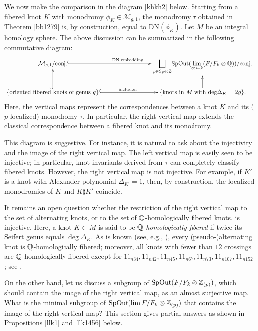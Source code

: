 \documentclass{article}
\theoremstyle{plain}
\theoremstyle{definition}
\newcommand{\Q}{{\Bbb Q}}
\newcommand{\Z}{{\Bbb Z}}
\begin{document}
{We now make the comparison in the diagram \eqref{khkh2} below.
Starting from a fibered knot $K$ with monodromy $\phi_K \in \mathcal{M}_{g,1}$, the monodromy $\tau$ obtained in Theorem \ref{bb1279} is, by construction, equal to $\mathrm{DN}(\phi_K)$.
Let $M$ be an integral homology sphere.
The above discussion can be summarized in the following commutative diagram:
\begin{equation}\label{khkh2}{
\xymatrix{ \mathcal{M}_{g,1} /\textrm{conj.} \ar@{^{(}->}[rrr]^{ \textrm{DN embedding} }
& & & \displaystyle{\bigsqcup_{ p \in \mathrm{Spec}\Z}} \mathrm{SpOut} (\lim_{\infty \leftarrow k } (F/ F_k \otimes \Q)) /\textrm{conj.}\\
\{ \textrm{oriented fibered knots of genus }g \}
\ar@{^{(}->}[u]
\ar@{^{(}->}[rrr]^{\rm inclusion} & & & \{ \textrm{knots in }M \textrm{ with deg}\Delta_K=2g\} . \ar[u]
}} \end{equation}
Here, the vertical maps represent the correspondences between a knot $K$ and its ($p$-localized) monodromy $\tau$. In particular, the right vertical map extends the classical correspondence between a fibered knot and its monodromy.

This diagram is suggestive. For instance, it is natural to ask about the injectivity and the image of the right vertical map. The left vertical map is easily seen to be injective; in particular, knot invariants derived from $\tau$ can completely classify fibered knots. However, the right vertical map is not injective. For example, if $K'$ is a knot with Alexander polynomial $\Delta_{K'} = 1$, then, by construction, the localized monodromies of $K$ and $K \sharp K'$ coincide.

It remains an open question whether the restriction of the right vertical map to the set of alternating knots, or to the set of $\Q$-homologically fibered knots, is injective. Here, a knot $K \subset M$ is said to be $\Q$-{\it homologically fibered} if twice its Seifert genus equals $\deg \Delta_K$. As is known (see, e.g., \cite{MM}), every (pseudo-)alternating knot is $\Q$-homologically fibered; moreover, all knots with fewer than $12$ crossings are $\Q$-homologically fibered except for
$11_{n34}\allowbreak,11_{n42}\allowbreak,11_{n45}\allowbreak, 11_{n67}\allowbreak,11_{n73}\allowbreak, 11_{n107}\allowbreak, 11_{n152}$; see \cite{CL}.

On the other hand, let us discuss a subgroup of $\mathrm{SpOut} (F/F_k \otimes \Z_{(p)})$, which should contain the image of the right vertical map, as an almost surjective map.
What is the minimal subgroup of $ \mathrm{SpOut} ( \lim F /F_k  \otimes \Z_{(p)}) $ that contains the image of the right vertical map?
This section gives partial answers as shown in Propositions \ref{llk1} and \ref{llk1456} below.

}
\end{document}
